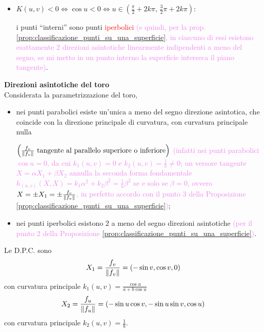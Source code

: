 \begin{esempio}
\begin{itemize}
            i punti dei due paralleli superiore e inferiore sono punti \textcolor{red}{parabolici} \textcolor{violet}{(non essendo mai nullo l'operatore di Weingarten poichè $k_2(u) = \frac{1}{b} \neq 0$, non ci sono punti planari; per la prop. \ref{prop:classificazione_punti_su_una_superficie}, lungo questi due paralleli esiste un'unica direzione asintotica a meno del segno)}.
            
            \item $K(u,v) < 0 \iff \cos u < 0 \iff u \in \left( \frac{\pi}{2} + 2k\pi, \, \frac{3}{2}\pi + 2k\pi \right)$:
            
            i punti ``interni'' sono punti \textcolor{red}{iperbolici} \textcolor{violet}{(e quindi, per la prop. \ref{prop:classificazione_punti_su_una_superficie}, in ciascuno di essi 
            esistono esattamente $2$ direzioni asintotiche linearmente indipendenti a meno del segno, se mi metto in un punto interno la superficie interseca il piano tangente)}.
        \end{itemize}
        \newpage
        \textbf{Direzioni asintotiche del toro}\\
        Considerata la parametrizzazione del toro,
        \begin{itemize}
            \item nei punti parabolici esiste un'unica a meno del segno direzione asintotica, che coincide con la direzione principale di curvatura, con curvatura principale nulla 
            
            $\left( \frac{f_v}{\lVert f_v\rVert} \text{ tangente al parallelo superiore o inferiore} \right)$ \textcolor{violet}{(infatti nei punti parabolici $\cos u = 0$, da cui $k_1(u,v) = 0$ e $k_2(u,v) = \frac{1}{b} \neq 0$; un versore tangente $X = \alpha X_1 + \beta X_2$ annulla la seconda forma fondamentale $h_{(u,v)}(X,X) = k_1 \alpha^2 + k_2 \beta^2 = \frac{1}{b}\beta^2$ se e solo se $\beta = 0$, ovvero $X = \pm X_1 = \pm \frac{f_v}{\lVert f_v\rVert}$, in perfetto accordo con il punto 3 della Proposizione \ref{prop:classificazione_punti_su_una_superficie})};
            \item nei punti iperbolici esistono $2$ a meno del segno direzioni asintotiche \textcolor{violet}{(per il punto 2 della Proposizione \ref{prop:classificazione_punti_su_una_superficie})}.
        \end{itemize}
        
        Le D.P.C. sono
        \[
        X_1 = \frac{f_v}{\lVert f_v\rVert} = (-\sin v, \cos v, 0)
        \]
        con curvatura principale $\displaystyle k_1(u,v) = \frac{\cos u}{a + b \cos u}$
        \[
        X_2 = \frac{f_u}{\lVert f_u\rVert} = (-\sin u \cos v, -\sin u \sin v, \cos u)
        \]
        con curvatura principale $\displaystyle k_2(u,v) = \frac{1}{b}$.


\end{esempio}
